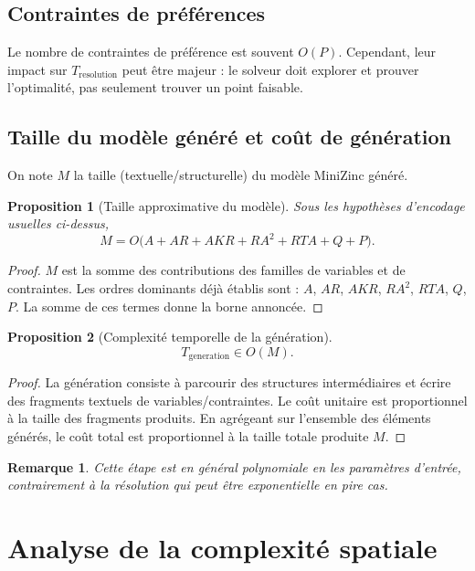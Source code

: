 \documentclass[12pt,a4paper]{article}
\newtheorem{proposition}{Proposition}[section]
\newtheorem{remark}{Remarque}[section]
\begin{document}
\subsection{Contraintes de préférences}
Le nombre de contraintes de préférence est souvent $O(P)$. Cependant, leur impact sur $T_{\text{resolution}}$ peut être majeur : le solveur doit explorer et prouver l'optimalité, pas seulement trouver un point faisable.

\subsection{Taille du modèle généré et coût de génération}
On note $M$ la taille (textuelle/structurelle) du modèle MiniZinc généré.

\begin{proposition}[Taille approximative du modèle]
Sous les hypothèses d'encodage usuelles ci-dessus,
\begin{equation}
M = O\big(A + AR + AKR + RA^2 + RTA + Q + P\big).
\end{equation}
\end{proposition}
\begin{proof}
$M$ est la somme des contributions des familles de variables et de contraintes. Les ordres dominants déjà établis sont : $A$, $AR$, $AKR$, $RA^2$, $RTA$, $Q$, $P$. La somme de ces termes donne la borne annoncée.
\end{proof}

\begin{proposition}[Complexité temporelle de la génération]
\begin{equation}
T_{\text{generation}} \in O(M).
\end{equation}
\end{proposition}
\begin{proof}
La génération consiste à parcourir des structures intermédiaires et écrire des fragments textuels de variables/contraintes. Le coût unitaire est proportionnel à la taille des fragments produits. En agrégeant sur l'ensemble des éléments générés, le coût total est proportionnel à la taille totale produite $M$.
\end{proof}

\begin{remark}
Cette étape est en général polynomiale en les paramètres d'entrée, contrairement à la résolution qui peut être exponentielle en pire cas.
\end{remark}

\section{Analyse de la complexité spatiale}
\end{document}
